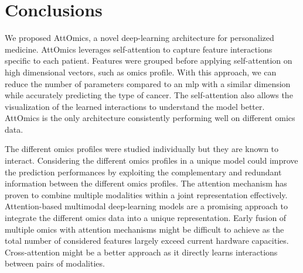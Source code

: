 \documentclass[../main.tex]{subfiles}
\begin{document}
\section{Conclusions}
	We proposed AttOmics, a novel deep-learning architecture for personalized medicine.
	AttOmics leverages self-attention to capture feature interactions specific to each patient.
	Features were grouped before applying self-attention on high dimensional vectors, such as omics profile.
	With this approach, we can reduce the number of parameters compared to an \gls{mlp} with a similar dimension while accurately predicting the type of cancer.
	The self-attention also allows the visualization of the learned interactions to understand the model better.
	AttOmics is the only architecture consistently performing well on different omics data.

	The different omics profiles were studied individually but they are known to interact.
	Considering the different omics profiles in a unique model could improve the prediction performances by exploiting the complementary and redundant information between the different omics profiles.
	The attention mechanism has proven to combine multiple modalities within a joint representation effectively.
	Attention-based multimodal deep-learning models are a promising approach to integrate the different omics data into a unique representation.
	Early fusion of multiple omics with attention mechanisms might be difficult to achieve as the total number of considered features largely exceed current hardware capacities.
	Cross-attention might be a better approach as it directly learns interactions between pairs of modalities.
\end{document}
